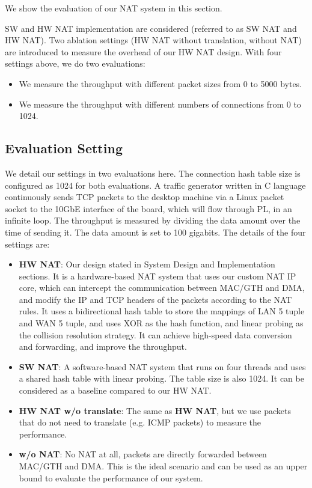 We show the evaluation of our NAT system in this section.

SW and HW NAT implementation are considered (referred to as SW NAT and HW NAT). Two ablation settings (HW NAT without translation, without NAT) are introduced to measure the overhead of our HW NAT design.
With four settings above, we do two evaluations:
\begin{itemize}
    \item We measure the throughput with different packet sizes from 0 to 5000 bytes.
    \item We measure the throughput with different numbers of connections from 0 to 1024.
\end{itemize}


\subsection{Evaluation Setting}

We detail our settings in two evaluations here. The connection hash table size is configured as 1024 for both evaluations. A traffic generator written in C language continuously sends TCP packets to the desktop machine via a Linux packet socket to the 10GbE interface of the board, which will flow through PL, in an infinite loop. The throughput is measured by dividing the data amount over the time of sending it. The data amount is set to 100 gigabits.
The details of the four settings are:

\begin{itemize}
    \item {\textbf{HW NAT}}: Our design stated in System Design and Implementation sections. It is a hardware-based NAT system that uses our custom NAT IP core, which can intercept the communication between MAC/GTH and DMA, and modify the IP and TCP headers of the packets according to the NAT rules. It uses a bidirectional hash table to store the mappings of LAN 5 tuple and WAN 5 tuple, and uses XOR as the hash function, and linear probing as the collision resolution strategy. It can achieve high-speed data conversion and forwarding, and improve the throughput.
    \item {\textbf{SW NAT}}: A software-based NAT system that runs on four threads and uses a shared hash table with linear probing. The table size is also 1024. It can be considered as a baseline compared to our HW NAT.
    \item {\textbf{HW NAT w/o translate}}: The same as \textbf{HW NAT}, but we use packets that do not need to translate (e.g. ICMP packets) to measure the performance.
    \item {\textbf{w/o NAT}}: No NAT at all, packets are directly forwarded between MAC/GTH and DMA. This is the ideal scenario and can be used as an upper bound to evaluate the performance of our system.
\end{itemize}


